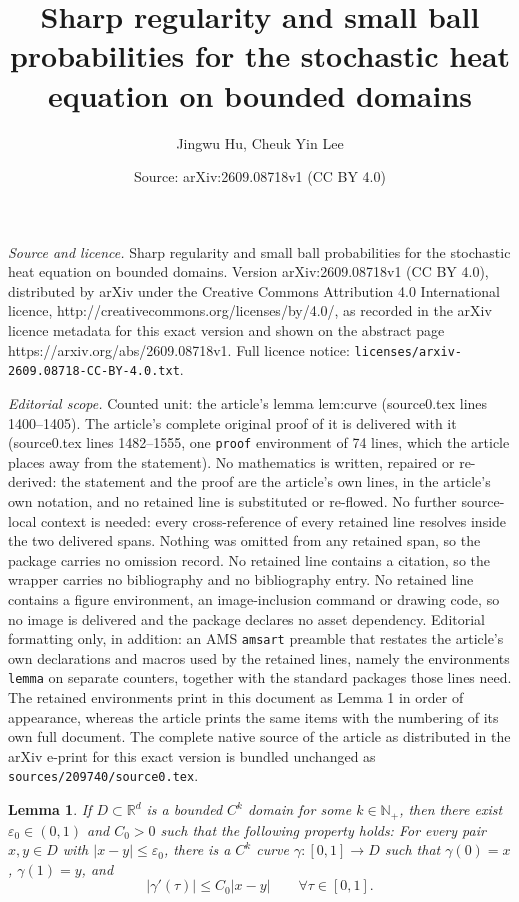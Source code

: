 \documentclass[10pt,a4paper]{amsart}
\title{Sharp regularity and small ball probabilities for the stochastic heat equation on bounded domains}
\author{Jingwu Hu, Cheuk Yin Lee}
\date{Source: arXiv:2609.08718v1 (CC BY 4.0)}
\newtheorem{lemma}{Lemma}
\newcommand{\N}{\mathbb N}
\newcommand{\R}{\mathbb R}
\begin{document}
\maketitle

\noindent\emph{Source and licence.} Sharp regularity and small ball probabilities for the stochastic heat equation on bounded domains. Version arXiv:2609.08718v1 (CC BY 4.0), distributed by arXiv under the Creative Commons Attribution 4.0 International licence, http://creativecommons.org/licenses/by/4.0/, as recorded in the arXiv licence metadata for this exact version and shown on the abstract page https://arxiv.org/abs/2609.08718v1. Full licence notice: \texttt{licenses/arxiv-2609.08718-CC-BY-4.0.txt}.\par\smallskip

\noindent\textit{Editorial scope.} Counted unit: the article's lemma lem:curve (source0.tex lines 1400--1405). The article's complete original proof of it is delivered with it (source0.tex lines 1482--1555, one \texttt{proof} environment of 74 lines, which the article places away from the statement). No mathematics is written, repaired or re-derived: the statement and the proof are the article's own lines, in the article's own notation, and no retained line is substituted or re-flowed.  No further source-local context is needed: every cross-reference of every retained line resolves inside the two delivered spans.  Nothing was omitted from any retained span, so the package carries no omission record.  No retained line contains a citation, so the wrapper carries no bibliography and no bibliography entry.  No retained line contains a figure environment, an image-inclusion command or drawing code, so no image is delivered and the package declares no asset dependency.  Editorial formatting only, in addition: an AMS \texttt{amsart} preamble that restates the article's own declarations and macros used by the retained lines, namely the environments \texttt{lemma} on separate counters, together with the standard packages those lines need.  The retained environments print in this document as Lemma 1 in order of appearance, whereas the article prints the same items with the numbering of its own full document.  The complete native source of the article as distributed in the arXiv e-print for this exact version is bundled unchanged as \texttt{sources/209740/source0.tex}.
\begin{lemma}\label{lem:curve}
If $D\subset \R^d$ is a bounded $C^k$ domain for some $k \in \N_+$, then there exist $\varepsilon_0 \in (0,1)$ and $C_0>0$ such that the following property holds: For every pair $x,y \in D$ with $|x-y|\le \varepsilon_0$, there is a $C^k$ curve $\gamma:[0,1] \to D$ such that $\gamma(0)=x$, $\gamma(1)=y$, and
\[
	|\gamma'(\tau)| \le C_0|x-y| \qquad \forall \tau \in [0,1].
\]
\end{lemma}
\end{document}
